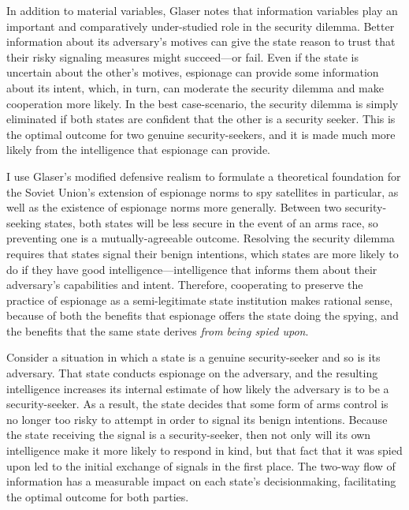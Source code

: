 \documentclass{memoir}
\begin{document}
\begin{refsegment}
In addition to material variables, Glaser notes that information variables play an important and comparatively under-studied role in the security dilemma. Better information about its adversary's motives can give the state reason to trust that their risky signaling measures might succeed---or fail. Even if the state is uncertain about the other's motives, espionage can provide some information about its intent, which, in turn, can moderate the security dilemma and make cooperation more likely. In the best case-scenario, the security dilemma is simply eliminated if both states are confident that the other is a security seeker. This is the optimal outcome for two genuine security-seekers, and it is made much more likely from the intelligence that espionage can provide.

I use Glaser's modified defensive realism to formulate a theoretical foundation for the Soviet Union's extension of espionage norms to spy satellites in particular, as well as the existence of espionage norms more generally. Between two security-seeking states, both states will be less secure in the event of an arms race, so preventing one is a mutually-agreeable outcome. Resolving the security dilemma requires that states signal their benign intentions, which states are more likely to do if they have good intelligence---intelligence that informs them about their adversary's capabilities and intent. Therefore, cooperating to preserve the practice of espionage as a semi-legitimate state institution makes rational sense, because of both the benefits that espionage offers the state doing the spying, and the benefits that the same state derives \emph{from being spied upon}.

Consider a situation in which a state is a genuine security-seeker and so is its adversary. That state conducts espionage on the adversary, and the resulting intelligence increases its internal estimate of how likely the adversary is to be a security-seeker. As a result, the state decides that some form of arms control is no longer too risky to attempt in order to signal its benign intentions. Because the state receiving the signal is a security-seeker, then not only will its own intelligence make it more likely to respond in kind, but that fact that it was spied upon led to the initial exchange of signals in the first place. The two-way flow of information has a measurable impact on each state's decisionmaking, facilitating the optimal outcome for both parties.



\end{refsegment}
\end{document}
